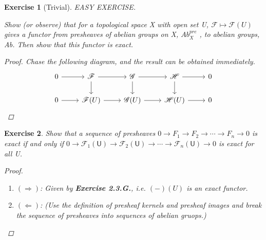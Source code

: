 \documentclass{article}
\theoremstyle{breakstyle}
\newtheorem{exercise}{Exercise}[section]
\begin{document}
\begin{exercise}[Trivial]
EASY EXERCISE.

Show (or observe) that for a topological space X with open set U, $\mathcal{F}
\mapsto \mathcal{F}(U)$ gives a functor from presheaves of abelian groups on X,
$Ab_{X}^{pre}$ , to abelian groups, Ab. Then show that this functor is exact.

\begin{proof}
    Chase the following diagram, and the result can be obtained immediately.
    $$
    \begin{tikzcd}
    0 \arrow[r] & \mathscr{F} \arrow[r] \arrow[d] & \mathscr{G} \arrow[r] \arrow[d] & \mathscr{H} \arrow[r] \arrow[d] & 0 \\
    0 \arrow[r] & \mathscr{F}{(U)} \arrow[r]      & \mathscr{G}{(U)} \arrow[r]      & \mathscr{H}{(U)} \arrow[r]      & 0
    \end{tikzcd}
    $$
\end{proof}

\end{exercise}

\begin{exercise}
Show that a sequence of presheaves $0 \rightarrow F_{1} \rightarrow F_{2}
\rightarrow \cdots \rightarrow F_{n} \rightarrow 0$ is exact if and only if $0
\rightarrow \mathcal{F}_{1}(\mathsf{U}) \rightarrow \mathcal{F}_{2}(\mathsf{U})
\rightarrow \cdots \rightarrow \mathcal{F}_{n}(\mathsf{U}) \rightarrow 0$ is
exact for all U.

\begin{proof}
    \begin{enumerate}[label=({\roman*})]
        \item $(\Rightarrow )$:
            Given by \textbf{Exercise 2.3.G.}, i.e. $\left( - \right) \left( U
            \right) $ is an exact functor.
        \item $(\Leftarrow )$:
            \emph{(Use the definition of presheaf kernels and presheaf images
            and break the sequence of presheaves into sequences of abelian
            gruops.)}
    \end{enumerate}
\end{proof}

\end{exercise}
\end{document}
